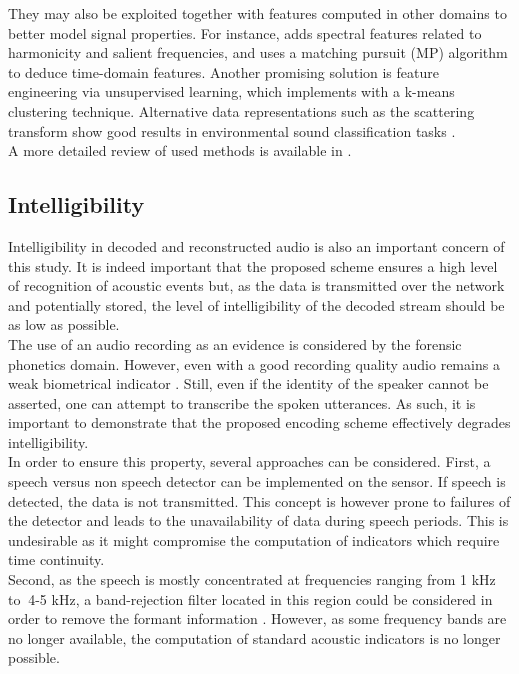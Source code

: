 \documentclass[12pt,times,onecolumn]{article}
\begin{document}
They may also be exploited together with features computed in other domains to better model signal properties. For instance, \cite{cai2006} adds spectral features related to harmonicity and salient frequencies, and \cite{chu2009} uses a matching pursuit (MP) algorithm to deduce time-domain features. Another promising solution is feature engineering via unsupervised learning, which \cite{salamon2015-2} implements with a k-means clustering technique. Alternative data representations such as the scattering transform \cite{bauge2013} show good results in environmental sound classification tasks \cite{salamon2015}.\\
A more detailed review of used methods is available in \cite{chachada2013}.

\subsection{Intelligibility}
\label{sec:unintelligibility}
Intelligibility in decoded and reconstructed audio is also an important concern of this study. It is indeed important that the proposed scheme ensures a high level of recognition of acoustic events but, as the data is transmitted over the network and potentially stored, the level of intelligibility of the decoded stream should be as low as possible.\\

The use of an audio recording as an evidence is considered by the forensic phonetics \cite{baldwin1990forensic} domain. However, even with a good recording quality audio remains a weak biometrical indicator \cite{boe2000forensic}. Still, even if the identity of the speaker cannot be asserted, one can attempt to transcribe the spoken utterances. As such, it is important to demonstrate that the proposed encoding scheme effectively degrades intelligibility.\\

In order to ensure this property, several approaches can be considered. First, a speech versus non speech detector can be implemented on the sensor. If speech is detected, the data is not transmitted. This concept is however prone to failures of the detector and leads to the unavailability of data during speech periods. This is undesirable as it might compromise the computation of indicators which require time continuity.\\

Second, as the speech is mostly concentrated at frequencies ranging from 1 kHz to $~$4-5 kHz, a band-rejection filter located in this region could be considered in order to remove the formant information \cite{kent1992acoustic}. However, as some frequency bands are no longer available, the computation of standard acoustic indicators is no longer possible.\\
\end{document}
